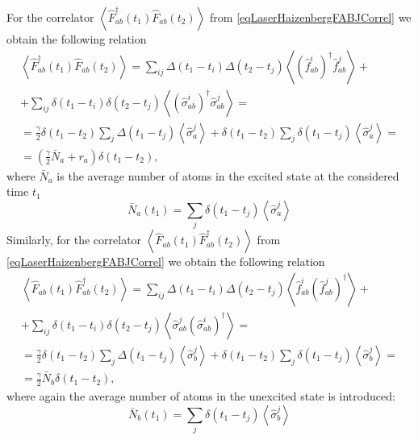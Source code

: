 For the correlator
$\left<\hat{F}_{ab}^{\dag}\left(t_1\right)\hat{F}_{ab}\left(t_2\right)\right>$
from \eqref{eqLaserHaizenbergFABJCorrel} we obtain the following relation
\begin{eqnarray}
\left<\hat{F}_{ab}^{\dag}\left(t_1\right)\hat{F}_{ab}\left(t_2\right)\right>
= \sum_{ij}\Delta\left(t_1 - t_i\right)\Delta\left(t_2 -
t_j\right)\left<\left(\hat{f}^{i}_{ab}\right)^{\dag}\hat{f}^{j}_{ab}\right>
+
\nonumber \\
+ 
\sum_{ij} \delta\left(t_1 - t_i\right)\delta\left(t_2 - t_j\right)
\left<\left(\hat{\sigma}^{i}_{ab}\right)^{\dag}\hat{\sigma}^{j}_{ab}\right>
= 
\nonumber \\
=
\frac{\gamma}{2}\delta\left(t_1 - t_2\right)\sum_{j}\Delta\left(t_1 -
t_j\right)\left<\hat{\sigma}^{j}_{a}\right> +
\delta\left(t_1 - t_2\right) \sum_{j} \delta\left(t_1 - t_j\right)
\left<\hat{\sigma}^{j}_{a}\right> 
=
\nonumber \\
= 
\left(
\frac{\gamma}{2}\bar{N}_a + r_a
\right)\delta\left(t_1 - t_2\right),
\label{eqLaserHaizenbergFABCorrel_1}
\end{eqnarray}
where $\bar{N}_a$ is the average number of atoms in the excited
state at the considered time $t_1$
\begin{equation}
\bar{N}_a\left(t_1\right) = \sum_{j} \delta\left(t_1 - t_j\right)
\left<\hat{\sigma}^{j}_{a}\right>
\nonumber 
\end{equation}
Similarly, for the correlator
$\left<\hat{F}_{ab}\left(t_1\right)\hat{F}_{ab}^{\dag}\left(t_2\right)\right>$
from \eqref{eqLaserHaizenbergFABJCorrel} we obtain the following relation
\begin{eqnarray}
\left<\hat{F}_{ab}\left(t_1\right)\hat{F}_{ab}^{\dag}\left(t_2\right)\right>
= \sum_{ij}\Delta\left(t_1 - t_i\right)\Delta\left(t_2 -
t_j\right)\left<\hat{f}^{i}_{ab}\left(\hat{f}^{j}_{ab}\right)^{\dag}\right>
+
\nonumber \\
+ 
\sum_{ij} \delta\left(t_1 - t_i\right)\delta\left(t_2 - t_j\right)
\left<\hat{\sigma}^{j}_{ab}\left(\hat{\sigma}^{i}_{ab}\right)^{\dag}\right>
= 
\nonumber \\
=
\frac{\gamma}{2}\delta\left(t_1 - t_2\right)\sum_{j}\Delta\left(t_1 -
t_j\right)\left<\hat{\sigma}^{j}_{b}\right> +
\delta\left(t_1 - t_2\right) \sum_{j} \delta\left(t_1 - t_j\right)
\left<\hat{\sigma}^{j}_{b}\right> 
=
\nonumber \\
= 
\frac{\gamma}{2}\bar{N}_b\delta\left(t_1 - t_2\right),
\label{eqLaserHaizenbergFABCorrel_2}
\end{eqnarray}
where again the average number of atoms in the unexcited state is introduced:
\begin{equation}
\bar{N}_b\left(t_1\right) = \sum_{j} \delta\left(t_1 - t_j\right)
\left<\hat{\sigma}^{j}_{b}\right>
\nonumber 
\end{equation}

